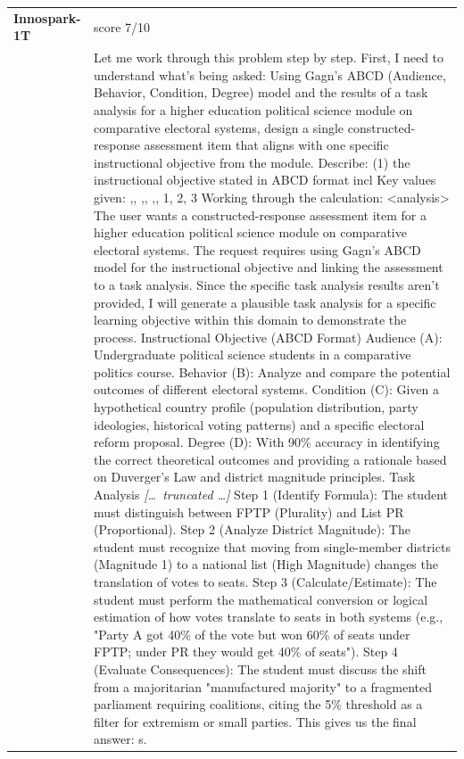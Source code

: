 \begin{longtable}{@{}l p{12.5cm}@{}}
  \textbf{Innospark-1T} & score 7/10 \\
  & Let me work through this problem step by step. \newline First, I need to understand what's being asked: Using Gagn's ABCD (Audience, Behavior, Condition, Degree) model and the results of a task analysis for a higher education political science module on comparative electoral systems, design a single constructed-response assessment item that aligns with one specific instructional objective from the module. Describe: (1) the instructional objective stated in ABCD format incl \newline Key values given: ,, ,, ,, 1, 2, 3 \newline Working through the calculation: \textless{}analysis\textgreater{} \newline The user wants a constructed-response assessment item for a higher education political science module on comparative electoral systems. The request requires using Gagn's ABCD model for the instructional objective and linking the assessment to a task analysis. Since the specific task analysis results aren't provided, I will generate a plausible task analysis for a specific learning objective within this domain to demonstrate the process. Instructional Objective (ABCD Format) \newline Audience (A): Undergraduate political science students in a comparative politics course. Behavior (B): Analyze and compare the potential outcomes of different electoral systems. Condition (C): Given a hypothetical country profile (population distribution, party ideologies, historical voting patterns) and a specific electoral reform proposal. Degree (D): With 90\% accuracy in identifying the correct theoretical outcomes and providing a rationale based on Duverger's Law and district magnitude principles. Task Analysis \newline \textit{[\ldots\ truncated \ldots]} \newline Step 1 (Identify Formula): The student must distinguish between FPTP (Plurality) and List PR (Proportional). Step 2 (Analyze District Magnitude): The student must recognize that moving from single-member districts (Magnitude 1) to a national list (High Magnitude) changes the translation of votes to seats. Step 3 (Calculate/Estimate): The student must perform the mathematical conversion or logical estimation of how votes translate to seats in both systems (e.g., "Party A got 40\% of the vote but won 60\% of seats under FPTP; under PR they would get 40\% of seats"). Step 4 (Evaluate Consequences): The student must discuss the shift from a majoritarian "manufactured majority" to a fragmented parliament requiring coalitions, citing the 5\% threshold as a filter for extremism or small parties. \newline This gives us the final answer: s. \\

\end{longtable}
